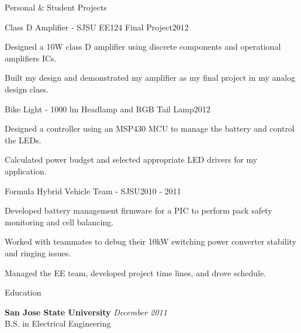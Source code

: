 \documentclass{resume} %
\begin{document}
\pagebreak[3]
\ssquish
\begin{rSection}{Personal \& Student Projects}

\ssquish
\begin{rProject}{Class D Amplifier - SJSU EE124 Final Project}{2012}
\item Designed a 10W class D amplifier using discrete components and operational amplifiers ICs.
\item Built my design and demonstrated my amplifier as my final project in my analog design class.
\end{rProject}

\ssquish
\begin{rProject}{Bike Light - 1000 lm Headlamp and RGB Tail Lamp}{2012}
\item Designed a controller using an MSP430 MCU to manage the battery and control the LEDs.
\item Calculated power budget and selected appropriate LED drivers for my application.
\end{rProject}

\ssquish
\begin{rProject}{Formula Hybrid Vehicle Team - SJSU}{2010 - 2011}
\item Developed battery management firmware for a PIC to perform pack safety monitoring and cell balancing.
\item Worked with teammates to debug their 10kW switching power converter stability and ringing issues.
\item Managed the EE team, developed project time lines, and drove schedule.
\end{rProject}
\end{rSection}

\pagebreak[3]
\begin{rSection}{Education}

{\bf San Jose State University} \hfill {\em December 2011} \\ 
B.S. in Electrical Engineering \\

\end{rSection}





\end{document}
